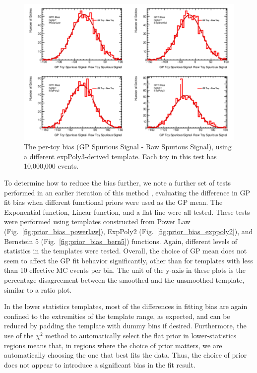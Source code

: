 \begin{figure} 
\begin{center}
  \includegraphics[width=\textwidth]{figures/background/gpr/validation/nominal/ToyTest_FitSigBiases_highpT_10M_noSig}   
\caption{The per-toy bias (GP Spurious Signal - Raw Spurious Signal), using a different expPoly3-derived template. Each toy in this test has 10,000,000 events.}
\label{fig:bias_highpt_10M_noSig}
\end{center}
\end{figure}

To determine how to reduce the bias further, we note a further set of tests performed in an earlier iteration of this method \cite{Hyneman:2712576}, evaluating the difference in GP fit bias when different functional priors were used as the GP mean. The Exponential function, Linear function, and a flat line were all tested. These tests were performed using templates constructed from Power Law (Fig.~\ref{fig:prior_bias_powerlaw}), ExpPoly2 (Fig.~\ref{fig:prior_bias_exppoly2}), and Bernstein 5 (Fig.~\ref{fig:prior_bias_bern5}) functions. Again, different levels of statistics in the templates were tested. Overall, the choice of GP mean does not seem to affect the GP fit behavior significantly, other than for templates with less than 10 effective MC events per bin. The unit of the y-axis in these plots is the percentage disagreement between the smoothed and the unsmoothed template, similar to a ratio plot.

In the lower statistics templates, most of the differences in fitting bias are again confined to the extremities of the template range, as expected, and can be reduced by padding the template with dummy bins if desired. Furthermore, the use of the $\chi^2$ method to automatically select the flat prior in lower-statistics regions means that, in regions where the choice of prior matters, we are automatically choosing the one that best fits the data. Thus, the choice of prior does not appear to introduce a significant bias in the fit result. 

